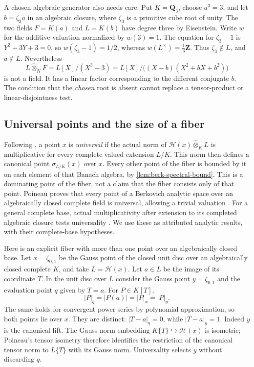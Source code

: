 A chosen algebraic generator also needs care. Put $K=\mathbf Q_3$,
choose $a^3=3$, and let $b=\zeta_3a$ in an algebraic closure,
where $\zeta_3$ is a primitive cube root of unity.
The two fields $F=K(a)$ and $L=K(b)$ have degree three by Eisenstein.
Write $w$ for the additive valuation normalized by $w(3)=1$.
The equation for $\zeta_3-1$ is $Y^2+3Y+3=0$, so
$w(\zeta_3-1)=1/2$, whereas $w(L^\times)=\tfrac13\mathbf Z$.
Thus $\zeta_3\notin L$, and $a\notin L$. Nevertheless
\[
 L\widehat\otimes_K F
       =L[X]/(X^3-3)
       =L[X]/\bigl((X-b)(X^2+bX+b^2)\bigr)
\]
is not a field. It has a linear factor corresponding to the different
conjugate $b$. The condition that the \emph{chosen} root is absent
cannot replace a tensor-product or linear-disjointness test.

\subsection{Universal points and the size of a fiber}
\label{subsec:berk-universal-fibers}

Following \cite[Definition~3.2, p.~279]{Poi13Angelic}, a point $x$ is
\emph{universal} if the actual norm of
$\mathcal H(x)\widehat\otimes_K L$ is multiplicative for every
complete valued extension $L/K$. This norm then defines a canonical
point $\sigma_{L/K}(x)$ over $x$. Every other point of the fiber is
bounded by it on each element of that Banach algebra, by
\cref{lem:berk-spectral-bound}. This is a dominating point of the
fiber, not a claim that the fiber consists only of that point.
Poineau proves that every point of a Berkovich analytic space over an
algebraically closed complete field is universal, allowing a trivial
valuation \cite[Corollary~3.14, p.~282]{Poi13Angelic}. For a general
complete base, actual multiplicativity after extension to its completed
algebraic closure tests universality
\cite[Corollary~3.16, p.~283]{Poi13Angelic}. We use these as attributed
analytic results, with their complete-base hypotheses.

Here is an explicit fiber with more than one point over an algebraically
closed base. Let $x=\zeta_{0,1}$ be the Gauss point of the closed unit
disc over an algebraically closed complete $K$, and take
$L=\mathcal H(x)$. Let $a\in L$ be the image of its coordinate $T$.
In the unit disc over $L$ consider the Gauss point $y=\zeta_{0,1}$
and the evaluation point $q$ given by $T=a$. For $P\in K[T]$,
\[
                         |P|_q=|P(a)|=|P|_x=|P|_y.
\]
The same holds for convergent power series by polynomial approximation,
so both points lie over $x$. They are distinct: $|T-a|_q=0$, while
$|T-a|_y=1$. Indeed $y$ is the canonical lift. The Gauss-norm
embedding $K\{T\}\hookrightarrow\mathcal H(x)$ is isometric;
Poineau's tensor isometry therefore identifies the restriction of the
canonical tensor norm to $L\{T\}$ with its Gauss norm. Universality
selects $y$ without discarding $q$.


